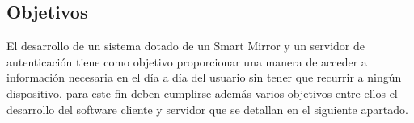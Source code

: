 \subsection{Objetivos}

El desarrollo de un sistema dotado de un Smart Mirror y un servidor de autenticación tiene como objetivo proporcionar una manera de acceder a información necesaria en el día a día del usuario sin tener que recurrir a ningún dispositivo, para este fin deben cumplirse además varios objetivos entre ellos el desarrollo del software cliente y servidor que se detallan en el siguiente apartado.
